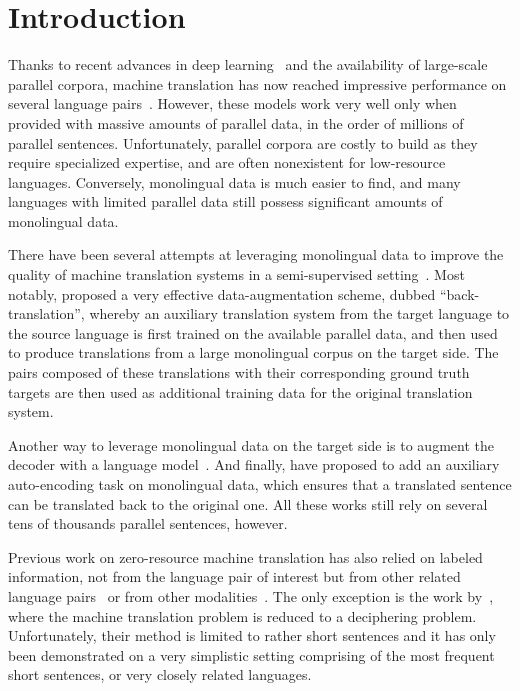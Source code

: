 
\section{Introduction}
\label{sec:introduction}
Thanks to recent advances in deep learning~\citep{sutskever2014sequence, attentionNMT} and the availability
of large-scale parallel corpora, machine translation has now reached impressive performance on several language pairs~\citep{wu2016google}. However, these models work very well only when provided with massive amounts of parallel data, in the order of millions of parallel sentences. Unfortunately, parallel corpora are costly to build as they require specialized expertise, and are often nonexistent for low-resource languages. Conversely, monolingual data is much easier to find, and many languages with limited parallel data still possess significant amounts of monolingual data.

There have been several attempts at leveraging monolingual data to improve the quality of machine translation systems in a semi-supervised setting~\citep{marcu04,irvine13,irvine15,zheng17}. Most notably,  \citet{sennrich2015improving} proposed a very effective data-augmentation scheme, dubbed ``back-translation'',
whereby an auxiliary translation system from the target language to the source language is first trained on the available parallel data, and then used to produce translations from a large monolingual corpus on the target side. The pairs composed of these translations with their corresponding ground truth targets are then used as additional training data for the original translation system. 

Another way to leverage monolingual data on the target side is to augment the decoder with a language model~\citep{gulcehre2015using}. And finally, \citet{cheng16, he2016dual} have proposed to add an auxiliary auto-encoding task on monolingual data, which ensures that a translated sentence can be translated back to the original one. All these works still rely on several tens of thousands parallel sentences, however.

Previous work on zero-resource machine translation has also relied on labeled information, not from the language pair of interest but from other related language pairs~\citep{firat16, gmt17, chen17acl} or from other modalities~\citep{nakayama17, lee17}. The only exception is the work by~\citet{knight_acl11, knight17}, where the machine translation problem is reduced to a deciphering problem. Unfortunately, their method is limited to rather short sentences and it has only been demonstrated on a very simplistic setting comprising of the most frequent short sentences, or very closely related languages.

